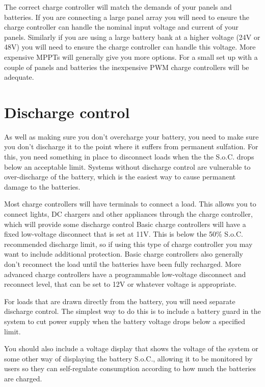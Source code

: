 \documentclass{article}
\theoremstyle{definition}
\theoremstyle{definition}
\theoremstyle{remark}
\begin{document}
    The correct charge controller will match the demands of your panels and batteries. If you are connecting a large panel array you will need to ensure the charge controller can handle the nominal input voltage and current of your panels. Similarly if you are using a large battery bank at a higher voltage (24V or 48V) you will need to ensure the charge controller can handle this voltage. More expensive MPPTs will generally give you more options. For a small set up with a couple of panels and batteries the inexpensive PWM charge controllers will be adequate. 
  


{\color{blue}\section{Discharge control}} %
\label{sec:discharge_control}

  As well as making sure you don’t overcharge your battery, you need to make sure you don’t discharge it to the point where it suffers from permanent sulfation. For this, you need something in place to disconnect loads when the the S.o.C. drops below an acceptable limit. Systems without discharge control are vulnerable to over-discharge of the battery, which is the easiest way to cause permanent damage to the batteries.

  Most charge controllers will have terminals to connect a load. This allows you to connect lights, DC chargers and other appliances through the charge controller, which will provide some discharge control Basic charge controllers will have a fixed low-voltage disconnect that is set at 11V. This is below the 50\% S.o.C. recommended discharge limit, so if using this type of charge controller you may want to include additional protection. Basic charge controllers also generally don't reconnect the load until the batteries have been fully recharged. More advanced charge controllers have a programmable low-voltage disconnect and reconnect level, that can be set to 12V or whatever voltage is appropriate.

  For loads that are drawn directly from the battery, you will need separate discharge control. The simplest way to do this is to include a battery guard in the system to cut power supply when the battery voltage drops below a specified limit. 

  You should also include a voltage display that shows the voltage of the system or some other way of displaying the battery S.o.C., allowing it to be monitored by users so they can self-regulate consumption according to how much the batteries are charged.
\end{document}

